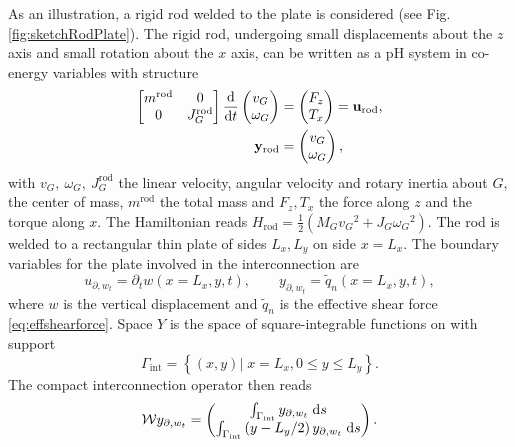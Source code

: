 As an illustration, a rigid rod welded to the plate is considered  (see Fig. \ref{fig:sketchRodPlate}). The rigid rod, undergoing small displacements about the $z$ axis and small rotation about the $x$ axis, can be written as a pH system in co-energy variables with structure
\begin{equation}
\begin{aligned}
\begin{bmatrix}
m^{\mathrm{rod}} & 0 \\
0   & J_G^{\mathrm{rod}} \\
\end{bmatrix} 
\displaystyle \diff{}{t}
\begin{pmatrix}
v_G \\ \omega_G \\
\end{pmatrix} & = \begin{pmatrix}
F_z \\ T_x \\
\end{pmatrix} = \mathbf{u}_{\text{rod}}\vspace{1mm}, \\
\mathbf{y}_{\text{rod}} &= \begin{pmatrix}
v_G \\ \omega_{G} \\
\end{pmatrix},
\end{aligned}
\end{equation}
with $v_G, \ \omega_{G}, \ J_G^{\mathrm{rod}}$ the linear velocity, angular velocity and rotary inertia about $G$, the center of mass, $m^{\mathrm{rod}}$ the total mass  and $F_z, T_x$ the force along $z$ and the torque along $x$. The Hamiltonian reads $H_{\text{rod}}  = \frac{1}{2} \left(M_G {v_G}^2 + J_G {\omega_G}^2 \right)$. The rod is welded to a rectangular thin plate of sides $L_x, L_y$ on side $x = L_x$. The boundary variables for the plate involved in the interconnection are 
\begin{equation*}
u_{\partial, w_t} = \partial_t w(x = L_x, y, t),  \qquad  y_{\partial, w_t} = \widetilde{q}_n(x = L_x, y, t),
\end{equation*}
where $w$ is the vertical displacement and $\widetilde{q}_n$ is the effective shear force \eqref{eq:effshearforce}. Space $Y$ is the space of square-integrable functions on with support 
$$\Gamma_{\text{int}} = \left\{ (x,y) \vert \; x=L_x, 0 \le y \le L_y  \right\}.$$ The compact interconnection operator then reads
\begin{equation}\label{eq:intKP_infdim}
\mathcal{W} y_{\partial, w_t} = \begin{pmatrix}
\int_{\Gamma_{\text{int}}} y_{\partial, w_t} \d{s} \\
\int_{\Gamma_{\text{int}}} \left( y - L_y/2 \right) y_{\partial, w_t} \d{s} \\
\end{pmatrix}.
\end{equation}
